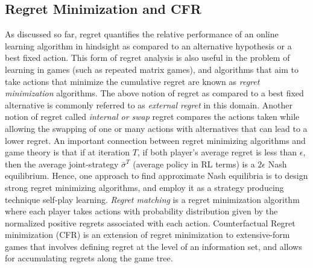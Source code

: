 \subsection{Regret Minimization and CFR}
As discussed so far, regret quantifies the relative performance of an online learning algorithm in
hindsight as compared to an alternative hypothesis or a best fixed action.
This form of regret analysis is also useful in the problem of learning in games (such as repeated
matrix games), and algorithms that aim to take actions that minimize the cumulative regret are
known as \textit{regret minimization} algorithms.
The above notion of regret as compared to a best fixed alternative is commonly referred to as
\textit{external regret} in this domain.
Another notion of regret called \textit{internal or swap} regret compares the actions taken while
allowing the swapping of one or many actions with alternatives that can lead to a lower regret.
An important connection between regret minimizing algorithms and game theory is that if at
iteration $T$, if both player's average regret is less than $\epsilon$, then the average
joint-strategy $\bar{\sigma}^T$ (average policy in RL terms) is a $2\epsilon$ Nash equilibrium.
Hence, one approach to find approximate Nash equilibria is to design strong regret minimizing
algorithms, and employ it as a strategy producing technique self-play learning.
\textit{Regret matching} is a regret minimization algorithm where each player takes actions with probability
distribution given by the normalized positive regrets associated with each action.
Counterfactual Regret minimization (CFR) is an extension of regret minimization to extensive-form
games that involves defining regret at the level of an information set, and allows for accumulating
regrets along the game tree.
